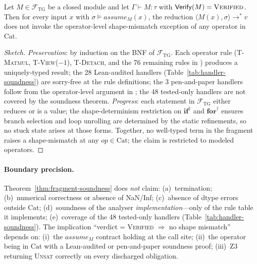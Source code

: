 \begin{theorem}
\label{thm:fragment-soundness}
Let $M\in\mathcal{F}_\mathrm{TG}$ be a closed module and let
$\Gamma\vdash M:\tau$ with $\mathsf{Verify}(M)=\textsc{Verified}$.
Then for every input $x$ with $\sigma\models\mathit{assume}_M(x)$, the
reduction $\langle M(x),\sigma\rangle\to^* v$ does not invoke the
operator-level shape-mismatch exception of any operator in $\mathrm{Cat}$.
\end{theorem}
\begin{proof}[Sketch]
\emph{Preservation}: by induction on the BNF of $\mathcal{F}_\mathrm{TG}$.
Each operator rule (\textsc{T-Matmul}, \textsc{T-View($-1$)},
\textsc{T-Detach}, and the 76 remaining rules in )
produces a uniquely-typed result; the 28 Lean-audited handlers
(Table~\ref{tab:handler-soundness}) are sorry-free at the rule definitions;
the 3 pen-and-paper handlers follow from the operator-level argument in
; the 48 tested-only handlers are not covered by
the soundness theorem.
\emph{Progress}: each statement in $\mathcal{F}_\mathrm{TG}$ either reduces
or is a value; the shape-determinism restriction on $\textbf{if}^\dagger$ and
$\textbf{for}^\dagger$ ensures branch selection and loop unrolling are
determined by the static refinements, so no stuck state arises at those
forms.
Together, no well-typed term in the fragment raises a shape-mismatch at any
$\mathit{op}\in\mathrm{Cat}$; the claim is restricted to modeled operators.
\end{proof}

\paragraph{Boundary precision.}
Theorem~\ref{thm:fragment-soundness} does \emph{not} claim:
(a)~termination;
(b)~numerical correctness or absence of NaN/Inf;
(c)~absence of dtype errors outside $\mathrm{Cat}$;
(d)~soundness of the analyser \emph{implementation}---only of the rule
table it implements;
(e)~coverage of the 48 tested-only handlers (Table~\ref{tab:handler-soundness}).
The implication ``verdict = \textsc{Verified} $\Rightarrow$ no shape mismatch''
depends on: (i)~the $\mathit{assume}_M$ contract holding at the call site;
(ii)~the operator being in $\mathrm{Cat}$ with a Lean-audited or
pen-and-paper soundness proof; (iii)~Z3 returning \textsc{Unsat} correctly
on every discharged obligation.

